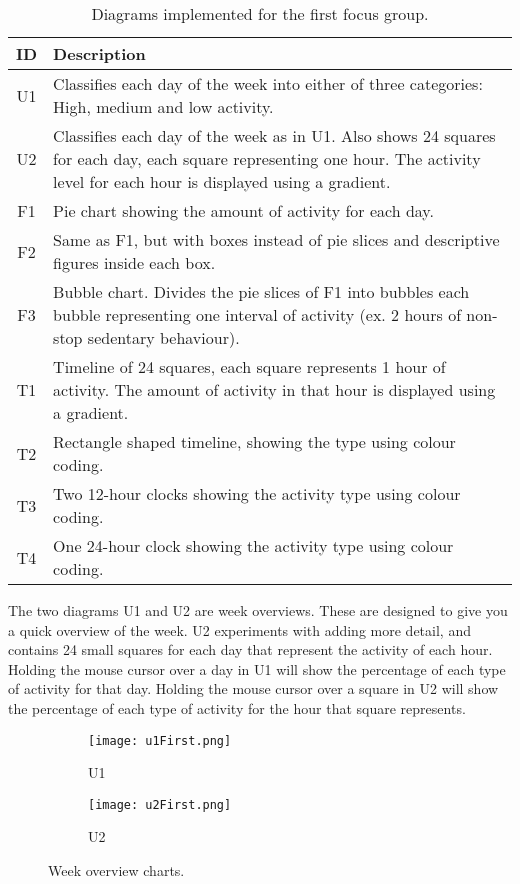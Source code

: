 \begin{table}[h!]
  \begin{center}
  \begin{tabular}{|c|p{10cm}|}
    \hline
    \textbf{ID} & \textbf{Description} \\ \hline
    U1 & Classifies each day of the week into either of three categories: High, medium and low activity. \\ \hline
    U2 & Classifies each day of the week as in U1. Also shows 24 squares for each day, each square representing one hour. The activity level for each hour is displayed using a gradient. \\ \hline
    F1 & Pie chart showing the amount of activity for each day. \\ \hline
    F2 & Same as F1, but with boxes instead of pie slices and descriptive figures inside each box. \\ \hline
    F3 & Bubble chart. Divides the pie slices of F1 into bubbles each bubble representing one interval of activity (ex. 2 hours of non-stop sedentary behaviour). \\ \hline
    T1 & Timeline of 24 squares, each square represents 1 hour of activity. The amount of activity in that hour is displayed using a gradient. \\ \hline
    T2 & Rectangle shaped timeline, showing the type using colour coding. \\ \hline
    T3 & Two 12-hour clocks showing the activity type using colour coding. \\ \hline
    T4 & One 24-hour clock showing the activity type using colour coding. \\ \hline
  \end{tabular}
  \end{center}
  \caption{Diagrams implemented for the first focus group.}
  \label{tab:runProtDesc1}
\end{table}

The two diagrams U1 and U2 are week overviews. These are designed to give you a quick overview of the week. U2 experiments with adding more detail, and contains 24 small squares for each day that represent the activity of each hour. Holding the mouse cursor over a day in U1 will show the percentage of each type of activity for that day. Holding the mouse cursor over a square in U2 will show the percentage of each type of activity for the hour that square represents.

\begin{figure}[h!]
  \centering
  \begin{subfigure}[b]{0.45\textwidth}
    \centering
    \texttt{[image: u1First.png]}
    \caption{U1}
  \end{subfigure}
  \begin{subfigure}[b]{0.45\textwidth}
    \centering
    \texttt{[image: u2First.png]}
    \caption{U2}
  \end{subfigure}
  \caption{Week overview charts.}
  \label{fig:runProt1}
\end{figure}

